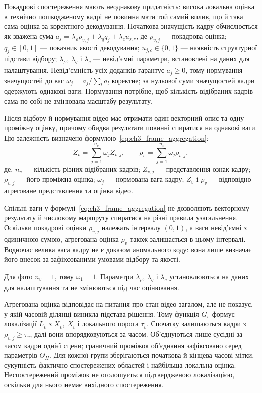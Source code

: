 Покадрові спостереження мають неоднакову придатність: висока локальна оцінка в технічно пошкодженому кадрі не повинна мати той самий вплив, що й така сама оцінка за коректного декодування. Початкова значущість кадру обчислюється як зважена сума $a_j=\lambda_\rho\rho_{v,j}+\lambda_q q_j+\lambda_c u_{j,c}$, де $\rho_{v,j}$ --- покадрова оцінка; $q_j\in[0,1]$ --- показник якості декодування; $u_{j,c}\in\{0,1\}$ --- наявність структурної підстави відбору; $\lambda_\rho$, $\lambda_q$ і $\lambda_c$ --- невід’ємні параметри, встановлені на даних для налаштування. Невід’ємність усіх доданків гарантує $a_j\geq 0$, тому нормування значущостей до ваг $\omega_j=a_j/\sum_{l}a_l$ коректне; за нульової суми значущостей кадри одержують однакові ваги. Нормування потрібне, щоб кількість відібраних кадрів сама по собі не змінювала масштабу результату.

Після відбору й нормування відео має отримати один векторний опис та одну проміжну оцінку, причому обидва результати повинні спиратися на однакові ваги. Цю залежність визначено формулою~\eqref{eq:ch3_frame_aggregation}:
\begin{equation}
Z_v=\sum_{j=1}^{n_v}\omega_jZ_{v,j},\qquad
\rho_v=\sum_{j=1}^{n_v}\omega_j\rho_{v,j},
\label{eq:ch3_frame_aggregation}
\end{equation}
де, $n_v$ --- кількість різних відібраних кадрів; $Z_{v,j}$ --- представлення ознак кадру; $\rho_{v,j}$ --- його проміжна оцінка; $\omega_j$ --- нормована вага кадру; $Z_v$ і $\rho_v$ --- відповідно агреговане представлення та оцінка відео.

Спільні ваги у формулі~\eqref{eq:ch3_frame_aggregation} не дозволяють векторному результату й числовому маршруту спиратися на різні правила узагальнення. Оскільки покадрові оцінки $\rho_{v,j}$ належать інтервалу $(0,1)$, а ваги невід’ємні з одиничною сумою, агрегована оцінка $\rho_v$ також залишається в цьому інтервалі. Водночас велика вага кадру не є доказом аномального коду: вона лише визначає його внесок за зафіксованими умовами відбору та якості.

Для фото $n_v=1$, тому $\omega_1=1$. Параметри $\lambda_\rho$, $\lambda_q$ і $\lambda_c$ установлюються на даних для налаштування та не змінюються під час оцінювання.

Агрегована оцінка відповідає на питання про стан відео загалом, але не показує, у якій часовій ділянці виникла підстава рішення. Тому функція $G_v$ формує локалізації $L_v$ з $X_v$, $X_t$ і локального порога $\tau_v$. Спочатку залишаються кадри з $\rho_{v,j}\geq\tau_v$, далі вони впорядковуються за часом. Об’єднуються лише сусідні за часом кадри однієї сцени; граничний проміжок об’єднання зафіксовано серед параметрів $\Theta_H$. Для кожної групи зберігаються початкова й кінцева часові мітки, сукупність фактично спостережених областей і найбільша локальна оцінка. Неспостережений проміжок не оголошується підтвердженою локалізацією, оскільки для нього немає вихідного спостереження.

